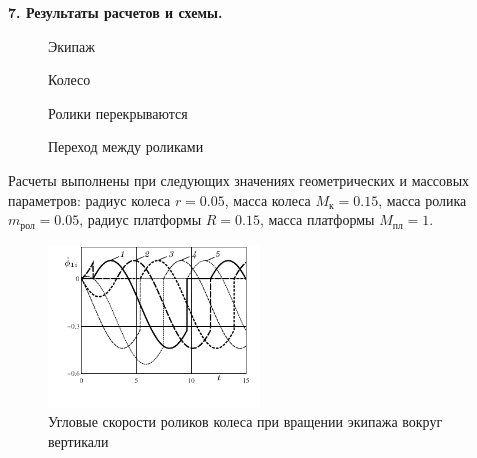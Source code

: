 % 

% 

% 

% 



{\bf 7. Результаты расчетов и схемы.}

\begin{figure}[H]
        \centering
        \caption{Экипаж}
        \label{fig:vehicle}
    \endminipage
        \centering
        \caption{Колесо}
        \label{fig:wheel}
    \endminipage
\end{figure}

\begin{figure}[H]
        \centering
        \caption{Ролики перекрываются}
        \label{fig:overlap}
    \endminipage
        \centering
        \caption{Переход между роликами}
        \label{fig:change}
    \endminipage
\end{figure}

Расчеты выполнены при следующих значениях геометрических и массовых параметров: радиус колеса $r = 0.05$, масса колеса $ M_{\text{к}} = 0.15$, масса ролика $m_{\text{рол}} = 0.05$, радиус платформы $R = 0.15$, масса платформы $M_{\text{пл}} = 1$.


\begin{figure}[h]
  \includegraphics[width=0.5\textwidth]{pic/figure5_1.pdf}
  \caption{Угловые скорости роликов колеса при вращении экипажа вокруг вертикали}\label{fig:selfrot}
\end{figure}

